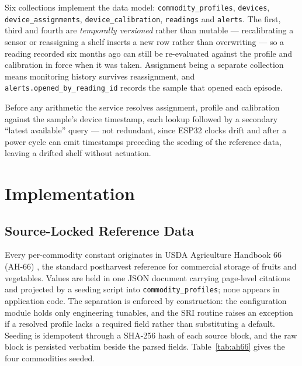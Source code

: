 \documentclass[conference]{IEEEtran}
\begin{document}
Six collections implement the data model: \texttt{commodity\_profiles},
\texttt{devices}, \texttt{device\_assignments},
\texttt{device\_calibration}, \texttt{readings} and \texttt{alerts}. The
first, third and fourth are \emph{temporally versioned} rather than
mutable --- recalibrating a sensor or reassigning a shelf inserts a new
row rather than overwriting --- so a reading recorded six months ago can
still be re-evaluated against the profile and calibration in force when it
was taken. Assignment being a separate collection means monitoring history
survives reassignment, and \texttt{alerts.opened\_by\_reading\_id} records
the sample that opened each episode.

Before any arithmetic the service resolves assignment, profile and
calibration against the sample's device timestamp, each lookup followed by
a secondary ``latest available'' query --- not redundant, since ESP32
clocks drift and after a power cycle can emit timestamps preceding the
seeding of the reference data, leaving a drifted shelf without actuation.

\section{Implementation}
\label{sec:implementation}

\subsection{Source-Locked Reference Data}
\label{sec:refdata}

Every per-commodity constant originates in USDA Agriculture Handbook 66
(AH-66) \cite{ah66}, the standard postharvest reference for commercial
storage of fruits and vegetables. Values are held in one JSON document
carrying page-level citations and projected by a seeding script into
\texttt{commodity\_profiles}; none appears in application code. The separation is enforced by construction: the configuration module holds
only engineering tunables, and the SRI routine raises an exception if a
resolved profile lacks a required field rather than substituting a
default. Seeding is idempotent through a SHA-256 hash of each source
block, and the raw block is persisted verbatim beside the parsed fields.
Table~\ref{tab:ah66} gives the four commodities seeded.
\end{document}
